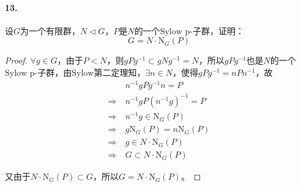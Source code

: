 \documentclass[12pt, a4paper, oneside]{ctexart}
\begin{document}
\paragraph{13.}设$G$为一个有限群，$N\triangleleft G$，$P$是$N$的一个$\text{Sylow p-子群}$，证明：
\begin{equation*}
    G=N\cdot \text{N}_G(P)
\end{equation*}
\begin{proof}
    $\forall g\in G$，由于$P < N$，则$gPg^{-1}\subset gNg^{-1} = N$，所以$gPg^{-1}$也是$N$的一个$\text{Sylow p-子群}$，由$\text{Sylow第二定理}$知，$\exists n\in N$，使得$gPg^{-1} = nPn^{-1}$，故
    \begin{equation*}
        \begin{aligned}
            &n^{-1}gPg^{-1}n = P\\
            \Rightarrow\ &n^{-1}gP(n^{-1}g)^{-1} = P\\
            \Rightarrow\ &n^{-1}g\in \text{N}_G(P)\\
            \Rightarrow\ &g\text{N}_G(P)=n\text{N}_G(P)\\
            \Rightarrow\ &g\in N\cdot \text{N}_G(P)\\
            \Rightarrow\ &G\subset N\cdot \text{N}_G(P)
        \end{aligned}
    \end{equation*}
    
    又由于$N\cdot\text{N}_G(P)\subset G$，所以$G=N\cdot\text{N}_G(P)$。
\end{proof}
\end{document}
